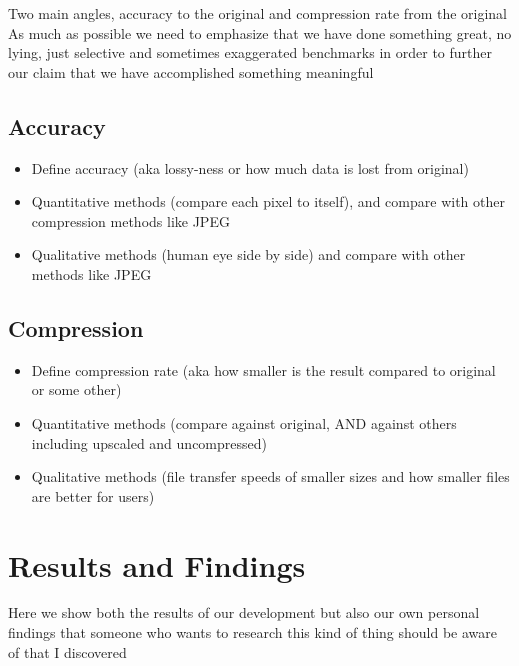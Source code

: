 \documentclass[12pt]{article}
\begin{document}
    Two main angles, accuracy to the original and compression rate from the original
    \linebreak
    As much as possible we need to emphasize that we have done something great,
    no lying, just selective and sometimes exaggerated benchmarks in order to further our claim that we
    have accomplished something meaningful

    \subsection{Accuracy}\label{subsec:accuracy}

    \begin{itemize}
        \item Define accuracy (aka lossy-ness or how much data is lost from original)
        \item Quantitative methods (compare each pixel to itself), and compare with other compression methods like JPEG
        \item Qualitative methods (human eye side by side) and compare with other methods like JPEG
    \end{itemize}

    \subsection{Compression}\label{subsec:compression}

    \begin{itemize}
        \item Define compression rate (aka how smaller is the result compared to original or some other)
        \item Quantitative methods (compare against original, AND against others including upscaled and uncompressed)
        \item Qualitative methods (file transfer speeds of smaller sizes and how smaller files are better for users)
    \end{itemize}

    \pagebreak


    \section{Results and Findings}\label{sec:results-and-findings}

    Here we show both the results of our development but also our own personal findings that someone who
    wants to research this kind of thing should be aware of that I discovered
\end{document}
